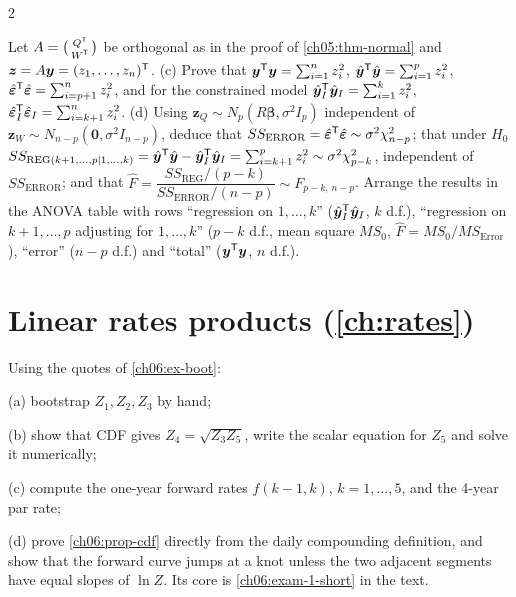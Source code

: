 \begin{paracol}{2}
\begin{exercise}\label{ch05:ex-ps3-3cd}
Let $A=\bigl(\begin{smallmatrix}Q^{\mathsf T}\\ W^{\mathsf T}\end{smallmatrix}\bigr)$ be orthogonal as in the proof of \cref{ch05:thm-normal} and $\bm z=A\bm y=(z_1,\dots,z_n)^{\mathsf T}$.
(c) Prove that $\bm y^{\mathsf T}\bm y=\sum_{i=1}^nz_i^2$, $\hat{\bm y}^{\mathsf T}\hat{\bm y}=\sum_{i=1}^pz_i^2$, $\hat{\bm\varepsilon}^{\mathsf T}\hat{\bm\varepsilon}=\sum_{i=p+1}^nz_i^2$, and for the constrained model
$\hat{\bm y}_I^{\mathsf T}\hat{\bm y}_I=\sum_{i=1}^kz_i^2$, $\hat{\bm\varepsilon}_I^{\mathsf T}\hat{\bm\varepsilon}_I=\sum_{i=k+1}^nz_i^2$.
(d) Using $\bm z_Q\sim N_p(R\bm\beta,\sigma^2I_p)$ independent of $\bm z_W\sim N_{n-p}(\bm 0,\sigma^2I_{n-p})$, deduce that
$SS_{\text{ERROR}}=\hat{\bm\varepsilon}^{\mathsf T}\hat{\bm\varepsilon}\sim\sigma^2\chi^2_{n-p}$; that under $H_0$
$SS_{\text{REG}(k+1,\dots,p\mid1,\dots,k)}=\hat{\bm y}^{\mathsf T}\hat{\bm y}-\hat{\bm y}_I^{\mathsf T}\hat{\bm y}_I=\sum_{i=k+1}^pz_i^2\sim\sigma^2\chi^2_{p-k}$, independent of
$SS_{\text{ERROR}}$; and that $\hat F=\dfrac{SS_{\text{REG}}/(p-k)}{SS_{\text{ERROR}}/(n-p)}\sim F_{p-k,\,n-p}$. Arrange the results in the ANOVA
table with rows ``regression on $1,\dots,k$'' ($\hat{\bm y}_I^{\mathsf T}\hat{\bm y}_I$, $k$ d.f.), ``regression on $k+1,\dots,p$ adjusting for
$1,\dots,k$'' ($p-k$ d.f., mean square $MS_0$, $\hat F=MS_0/MS_{\text{Error}}$), ``error'' ($n-p$ d.f.) and ``total'' ($\bm y^{\mathsf T}\bm y$,
$n$ d.f.).
\end{exercise}

\section{Linear rates products (\cref{ch:rates})}\label{exam:ch06}

\begin{exercise}\label{ch06:exam-1}
Using the quotes of \cref{ch06:ex-boot}:

(a) bootstrap $Z_1,Z_2,Z_3$ by hand;

(b) show that CDF gives $Z_4=\sqrt{Z_3Z_5}$, write the scalar
equation for $Z_5$ and solve it numerically;

(c) compute the one-year forward rates $f(k-1,k)$,
$k=1,\dots,5$, and the 4-year par rate;

(d) prove \cref{ch06:prop-cdf} directly from the daily compounding
definition, and show that the forward curve jumps at a knot unless
the two adjacent segments have equal slopes of $\ln Z$.
Its core is \cref{ch06:exam-1-short} in the text.
\end{exercise}


\end{paracol}
